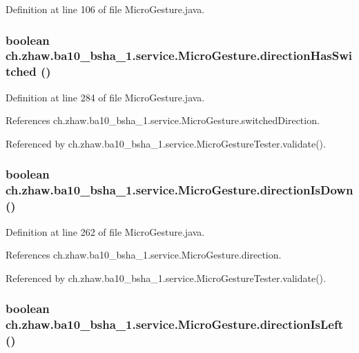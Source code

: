 Definition at line 106 of file MicroGesture.java.\hypertarget{classch_1_1zhaw_1_1ba10__bsha__1_1_1service_1_1MicroGesture_a6ac77efbcacfb83da624687c2362b2a9}{
\subsubsection[{directionHasSwitched}]{\setlength{\rightskip}{0pt plus 5cm}boolean ch.zhaw.ba10\_\-bsha\_\-1.service.MicroGesture.directionHasSwitched ()}}
\label{classch_1_1zhaw_1_1ba10__bsha__1_1_1service_1_1MicroGesture_a6ac77efbcacfb83da624687c2362b2a9}


Definition at line 284 of file MicroGesture.java.

References ch.zhaw.ba10\_\-bsha\_\-1.service.MicroGesture.switchedDirection.

Referenced by ch.zhaw.ba10\_\-bsha\_\-1.service.MicroGestureTester.validate().\hypertarget{classch_1_1zhaw_1_1ba10__bsha__1_1_1service_1_1MicroGesture_af20c9c32f3b4f9924bffffc78b7697e6}{
\subsubsection[{directionIsDown}]{\setlength{\rightskip}{0pt plus 5cm}boolean ch.zhaw.ba10\_\-bsha\_\-1.service.MicroGesture.directionIsDown ()}}
\label{classch_1_1zhaw_1_1ba10__bsha__1_1_1service_1_1MicroGesture_af20c9c32f3b4f9924bffffc78b7697e6}


Definition at line 262 of file MicroGesture.java.

References ch.zhaw.ba10\_\-bsha\_\-1.service.MicroGesture.direction.

Referenced by ch.zhaw.ba10\_\-bsha\_\-1.service.MicroGestureTester.validate().\hypertarget{classch_1_1zhaw_1_1ba10__bsha__1_1_1service_1_1MicroGesture_a4d4320e029aef962577b2ccc85f2ee57}{
\subsubsection[{directionIsLeft}]{\setlength{\rightskip}{0pt plus 5cm}boolean ch.zhaw.ba10\_\-bsha\_\-1.service.MicroGesture.directionIsLeft ()}}
\label{classch_1_1zhaw_1_1ba10__bsha__1_1_1service_1_1MicroGesture_a4d4320e029aef962577b2ccc85f2ee57}


